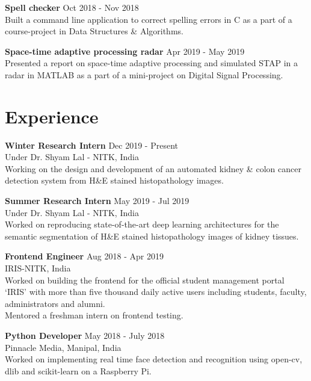\documentclass[letterpaper]{article}
\renewenvironment{itemize}{
  \begin{list}{}{
    \setlength{\leftmargin}{1.5em}
  }
}{
  \end{list}
}
\newcommand{\datefont}[1]{\textcolor{black!80}{\small{#1}}}
\begin{document}
\begin{itemize}
    \item
    \textbf{Spell checker}
    \hfill{\datefont{Oct 2018 - Nov 2018}}\\
      Built a command line application to correct spelling errors in C as a part of a course-project in Data Structures \& Algorithms.

    \item
    \textbf{Space-time adaptive processing radar}
    \hfill{\datefont{Apr 2019 - May 2019}}\\
      Presented a report on space-time adaptive processing and simulated STAP in a radar in MATLAB as a part of a mini-project on Digital Signal Processing.

  \end{itemize}


\section*{Experience}
  \begin{itemize}
    \item \textbf{Winter Research Intern}
    \hfill{\textcolor{black!80}{\small{Dec 2019 - Present}}}\\
    \datefont{Under Dr. Shyam Lal - NITK, India}\\
      Working on the design and development of an automated kidney \& colon cancer detection system from H\&E stained histopathology images.

    \item \textbf{Summer Research Intern}
    \hfill{\textcolor{black!80}{\small{May 2019 - Jul 2019}}}\\
    \datefont{Under Dr. Shyam Lal - NITK, India}\\
      Worked on reproducing state-of-the-art deep learning architectures for the semantic segmentation of H\&E stained histopathology images of kidney tissues.

    \item \textbf{Frontend Engineer}
    \hfill{\textcolor{black!80}{\small{Aug 2018 - Apr 2019}}}\\
    \datefont{IRIS-NITK, India}\\
      Worked on building the frontend for the official student management portal `IRIS' with more than five thousand daily active users including students, faculty, administrators and alumni.\\
      Mentored a freshman intern on frontend testing.

    \item \textbf{Python Developer}
    \hfill{\textcolor{black!80}{\small{May 2018 - July 2018}}}\\
    \datefont{Pinnacle Media, Manipal, India}\\
      Worked on implementing real time face detection and recognition using open-cv, dlib and scikit-learn on a Raspberry Pi.
  \end{itemize}
\end{document}
